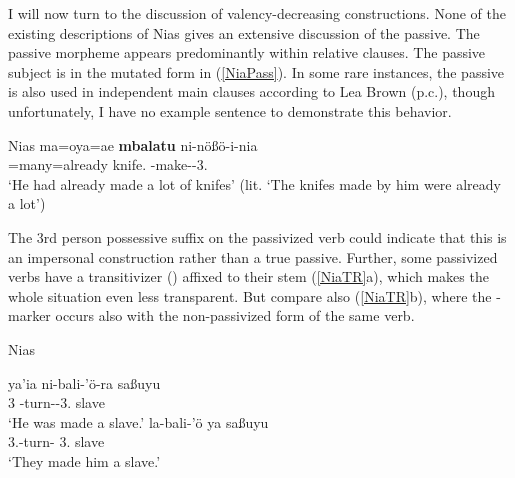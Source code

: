 
I will now turn to the discussion of valency-decreasing constructions.
None of the existing descriptions of Nias gives an extensive discussion of the passive. 
The passive morpheme appears predominantly within relative clauses.
The passive subject is in the mutated form in (\ref{NiaPass}). 
In some rare instances, the passive is also used in independent main clauses according to Lea Brown (p.c.), though unfortunately, I have no example sentence to demonstrate this behavior. 

\medskip
\begin{exe}\ex\label{NiaPass}  {Nias}  \citep[573]{Brown:2001}\nopagebreak[4]
\gll ma=oya=ae \textbf{mbalatu} ni-n\"o\ss \"o-i-nia\\
\pfv{}=many=already knife.\mut{} \pass{}-make-\transitiv{}-3\sg{}.\poss{}\\
`He had already made a lot of knifes' (lit. `The knifes made by him were already a lot')
\end{exe}

The 3rd person possessive suffix on the passivized verb could indicate that this is an impersonal construction rather than a true passive.
Further, some passivized verbs have a transitivizer (\transitiv{}) affixed to their stem (\ref{NiaTR}a), which makes the whole situation even less transparent. But compare also (\ref{NiaTR}b), where the \transitiv{}-marker occurs also with the non-passivized form of the same verb. 

\begin{exe}\ex\label{NiaTR} {Nias} \citep[556, 555]{Brown:2001}\nopagebreak[4]
\begin{xlist}
\ex\gll ya'ia ni-bali-'\"o-ra sa\ss uyu\\
3\sg{} \pass{}-turn-\transitiv{}-3\pl{}.\poss{} slave\\
`He was made a slave.'
\ex\gll la-bali-'\"o ya sa\ss uyu\\
3\pl{}.\rls{}-turn-\transitiv{} 3\sg{}.\mut{} slave\\
`They made him a slave.'
\end{xlist}

\end{exe}

